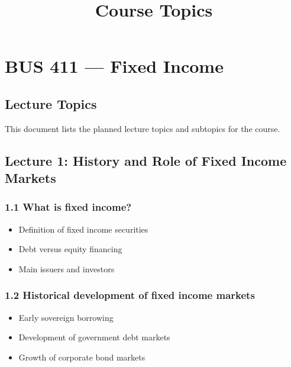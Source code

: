 \documentclass[
  letterpaper,
  DIV=11,
  numbers=noendperiod]{scrartcl}
\title{Course Topics}
\author{}
\date{}
\providecommand{\tightlist}{%
  \setlength{\itemsep}{0pt}\setlength{\parskip}{0pt}}
\renewcommand*\contentsname{Table of contents}
\newcommand\contentsname{Table of contents}
\begin{document}
\maketitle

\renewcommand*\contentsname{Table of contents}
{
\hypersetup{linkcolor=}
\setcounter{tocdepth}{3}
\tableofcontents
}

\section{BUS 411 --- Fixed Income}\label{bus-411-fixed-income}

\subsection{Lecture Topics}\label{lecture-topics}

This document lists the planned lecture topics and subtopics for the
course.

\subsection{Lecture 1: History and Role of Fixed Income
Markets}\label{lecture-1-history-and-role-of-fixed-income-markets}

\subsubsection{1.1 What is fixed income?}\label{what-is-fixed-income}

\begin{itemize}
\tightlist
\item
  Definition of fixed income securities
\item
  Debt versus equity financing
\item
  Main issuers and investors
\end{itemize}

\subsubsection{1.2 Historical development of fixed income
markets}\label{historical-development-of-fixed-income-markets}

\begin{itemize}
\tightlist
\item
  Early sovereign borrowing
\item
  Development of government debt markets
\item
  Growth of corporate bond markets
\end{itemize}
\end{document}
